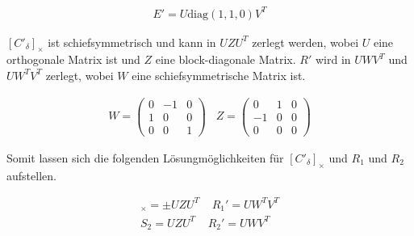 \begin{gather}
	E' = U\text{diag}(1,1,0)V^T
\end{gather}  



%

$[C'_\delta]_\times$ ist schiefsymmetrisch und kann in $UZU^T$ zerlegt werden, wobei $U$ eine orthogonale Matrix ist und $Z$ eine block-diagonale Matrix\cite{HZ}. $R'$ wird in $UWV^T$ und $UW^TV^T$ zerlegt, wobei $W$ eine schiefsymmetrische Matrix ist\cite{Ferid,HZ,phdextrinsicPara}.%



\begin{gather}
W = \begin{pmatrix}
0&-1&0\\
1&0&0\\
0&0&1
\end{pmatrix} \;\;\;
Z=
\begin{pmatrix}
0&1&0\\
-1&0&0\\
0&0&0
\end{pmatrix}
\end{gather}


Somit lassen sich die folgenden Lösungmöglichkeiten für $[C'_\delta]_\times$ und $R_1$ und $R_2$ aufstellen\cite{HZ,Ferid}.


\begin{gather}
[C'_\delta]_\times = \pm UZU^T \;\;\;\; R_1' = UW^TV^T\\
S_2 = UZU^T \;\;\;\; R_2' = UWV^T
\end{gather}\\


